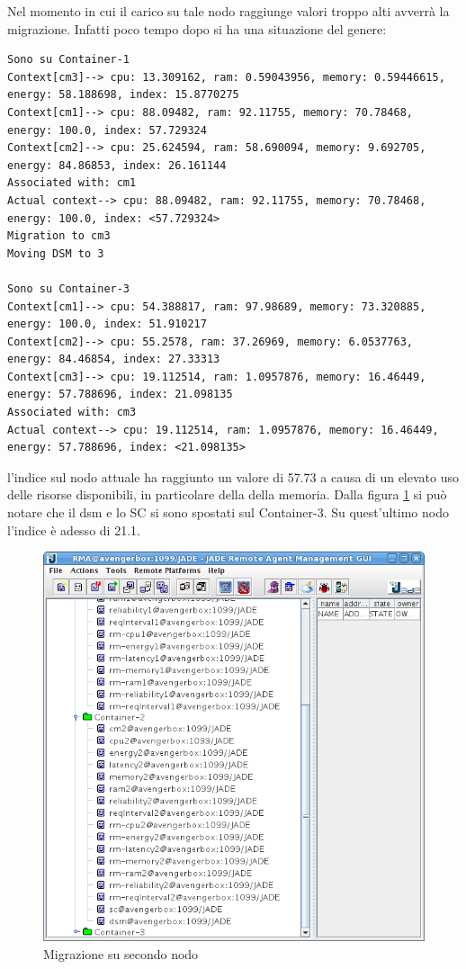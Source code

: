Nel momento in cui il carico su tale nodo raggiunge valori troppo alti avverrà la migrazione. Infatti poco tempo dopo si ha una situazione del genere:
\begin{lstlisting}
Sono su Container-1
Context[cm3]--> cpu: 13.309162, ram: 0.59043956, memory: 0.59446615, energy: 58.188698, index: 15.8770275
Context[cm1]--> cpu: 88.09482, ram: 92.11755, memory: 70.78468, energy: 100.0, index: 57.729324
Context[cm2]--> cpu: 25.624594, ram: 58.690094, memory: 9.692705, energy: 84.86853, index: 26.161144
Associated with: cm1
Actual context--> cpu: 88.09482, ram: 92.11755, memory: 70.78468, energy: 100.0, index: <57.729324>
Migration to cm3
Moving DSM to 3

Sono su Container-3
Context[cm1]--> cpu: 54.388817, ram: 97.98689, memory: 73.320885, energy: 100.0, index: 51.910217
Context[cm2]--> cpu: 55.2578, ram: 37.26969, memory: 6.0537763, energy: 84.46854, index: 27.33313
Context[cm3]--> cpu: 19.112514, ram: 1.0957876, memory: 16.46449, energy: 57.788696, index: 21.098135
Associated with: cm3
Actual context--> cpu: 19.112514, ram: 1.0957876, memory: 16.46449, energy: 57.788696, index: <21.098135>
\end{lstlisting}
l'indice sul nodo attuale ha raggiunto un valore di 57.73 a causa di un elevato uso delle risorse disponibili, in particolare della della memoria. Dalla figura \ref{fig:secondo} si può notare che il dsm e lo SC si sono spostati sul Container-3. Su quest'ultimo nodo l'indice è adesso di 21.1.
\begin{figure}[H]
\begin{center}
\includegraphics[scale=0.5]{etc/secondo.png}
\caption{Migrazione su secondo nodo}
\label{fig:secondo}
\end{center}
\end{figure}
